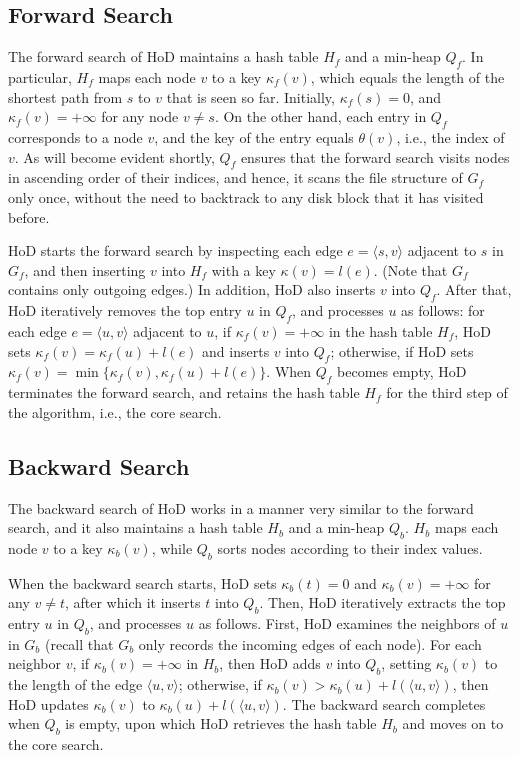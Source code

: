 \documentclass{sig-alternate}
\def\GF{G_f}
\def\GB{G_b}
\def\HF{H_f}
\def\HB{H_b}
\def\QF{Q_f}
\def\QB{Q_b}
\def\kf{\kappa_f}
\def\kb{\kappa_b}
\begin{document}
\begin{sloppy}
\subsection{Forward Search} \label{sec:p2p-forward}

The forward search of HoD maintains a hash table $\HF$ and a min-heap $\QF$. In particular, $\HF$ maps each node $v$ to a key $\kf(v)$, which equals the length of the shortest path from $s$ to $v$ that is seen so far. Initially, $\kf(s) = 0$, and $\kf(v) = +\infty$ for any node $v \ne s$. On the other hand, each entry in $\QF$ corresponds to a node $v$, and the key of the entry equals $\theta(v)$, i.e., the index of $v$. As will become evident shortly, $\QF$ ensures that the forward search visits nodes in ascending order of their indices, and hence, it scans the file structure of $\GF$ only once, without the need to backtrack to any disk block that it has visited before.

HoD starts the forward search by inspecting each edge $e = \langle s, v\rangle$ adjacent to $s$ in $\GF$, and then inserting $v$ into $\HF$ with a key $\kappa(v) = l(e)$. (Note that $\GF$ contains only outgoing edges.) In addition, HoD also inserts $v$ into $\QF$. After that, HoD iteratively removes the top entry $u$ in $\QF$, and processes $u$ as follows: for each edge $e = \langle u, v\rangle$ adjacent to $u$, if $\kf(v) = +\infty$ in the hash table $\HF$, HoD sets $\kf(v) = \kf(u) + l(e)$ and inserts $v$ into $\QF$; otherwise, if HoD sets $\kf(v) = \min\{\kf(v), \kf(u) + l(e)\}$. When $\QF$ becomes empty, HoD terminates the forward search, and retains the hash table $\HF$ for the third step of the algorithm, i.e., the core search.

\subsection{Backward Search} \label{sec:p2p-backward}

The backward search of HoD works in a manner very similar to the forward search, and it also maintains a hash table $\HB$ and a min-heap $\QB$. $\HB$ maps each node $v$ to a key $\kb(v)$, while $\QB$ sorts nodes according to their index values.

When the backward search starts, HoD sets $\kb(t) = 0$ and $\kb(v) = +\infty$ for any $v \ne t$, after which it inserts $t$ into $\QB$. Then, HoD iteratively extracts the top entry $u$ in $\QB$, and processes $u$ as follows. First, HoD examines the neighbors of $u$ in $\GB$ (recall that $\GB$ only records the incoming edges of each node). For each neighbor $v$, if $\kb(v) = +\infty$ in $\HB$, then HoD adds $v$ into $\QB$, setting $\kb(v)$ to the length of the edge $\langle u, v \rangle$; otherwise, if $\kb(v) > \kb(u) + l(\langle u, v \rangle)$, then HoD updates $\kb(v)$ to $\kb(u) + l(\langle u, v \rangle)$. The backward search completes when $\QB$ is empty, upon which HoD retrieves the hash table $\HB$ and moves on to the core search.


\end{sloppy}
\end{document}
